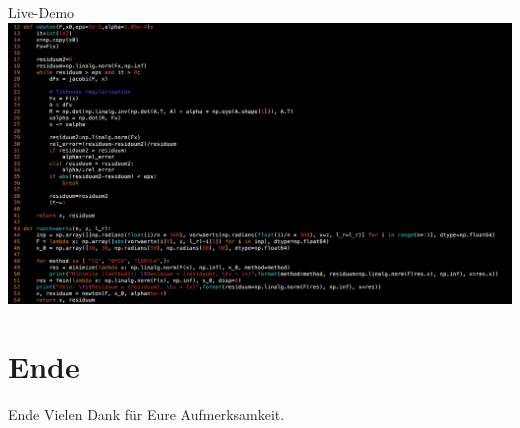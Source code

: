 \documentclass[compress]{beamer}
\begin{document}
\begin{frame}{Live-Demo}
	\centering
	\includegraphics[width=\linewidth]{images/quellcode.png}
\end{frame}

\section{Ende}
\begin{frame}{Ende}
	\centering
	Vielen Dank für Eure Aufmerksamkeit.
\end{frame}
\end{document}
